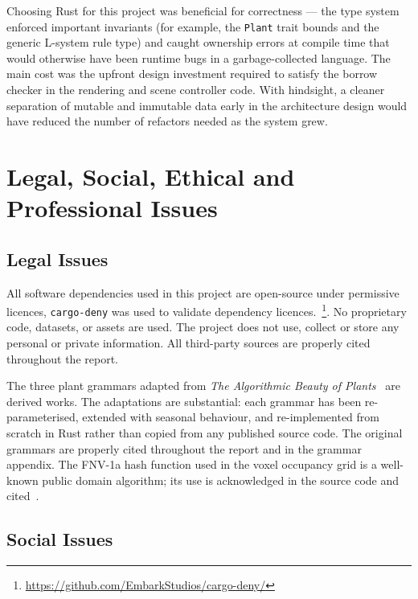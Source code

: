 \begin{appendices}
\medskip
Choosing Rust for this project was beneficial for correctness --- the type system enforced important
invariants (for example, the \texttt{Plant} trait bounds and the generic L-system rule type) and caught
ownership errors at compile time that would otherwise have been runtime bugs in a garbage-collected language.
The main cost was the upfront design investment required to satisfy the borrow checker in the rendering and
scene controller code. With hindsight, a cleaner separation of mutable and immutable data early in the
architecture design would have reduced the number of refactors needed as the system grew.

\section{Legal, Social, Ethical and Professional Issues}

\subsection{Legal Issues}

All software dependencies used in this project are open-source under permissive licences, \texttt{cargo-deny}
was used to validate dependency licences.~\footnote{\url{https://github.com/EmbarkStudios/cargo-deny/}}. No
proprietary code, datasets, or assets are used. The project does not use, collect or store any personal or
private information. All third-party sources are properly cited throughout the report.

\medskip
The three plant grammars adapted from \textit{The Algorithmic Beauty of
Plants}~\cite{prusinkiewiczAlgorithmicBeautyPlants1990} are derived works. The adaptations are substantial:
each grammar has been re-parameterised, extended with seasonal behaviour, and re-implemented from scratch in
Rust rather than copied from any published source code. The original grammars are properly cited throughout
the report and in the grammar appendix. The FNV-1a hash function used in the voxel occupancy grid is a
well-known public domain algorithm; its use is acknowledged in the source code and
cited~\cite{fowlerFNVNonCryptographicHash2026}.

\subsection{Social Issues}


\end{appendices}
